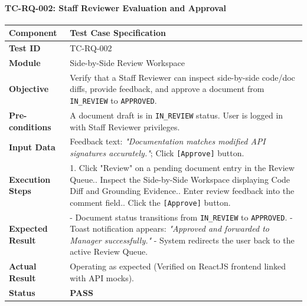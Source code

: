\vspace{0.3cm}

\paragraph{TC-RQ-002: Staff Reviewer Evaluation and Approval}

\begin{longtable}{|l|p{10.5cm}|}
    \hline
    \textbf{Component} & \textbf{Test Case Specification} \\ \hline
    \textbf{Test ID} & TC-RQ-002 \\ \hline
    \textbf{Module} & Side-by-Side Review Workspace \\ \hline
    \textbf{Objective} & Verify that a Staff Reviewer can inspect side-by-side code/doc diffs, provide feedback, and approve a document from \texttt{IN\_REVIEW} to \texttt{APPROVED}. \\ \hline
    \textbf{Pre-conditions} & A document draft is in \texttt{IN\_REVIEW} status. User is logged in with Staff Reviewer privileges. \\ \hline
    \textbf{Input Data} & Feedback text: \textit{"Documentation matches modified API signatures accurately."}; Click \texttt{[Approve]} button. \\ \hline
    \textbf{Execution Steps} & 
    1. Click "Review" on a pending document entry in the Review Queue.\newline
    2. Inspect the Side-by-Side Workspace displaying Code Diff and Grounding Evidence.\newline
    3. Enter review feedback into the comment field.\newline
    4. Click the \texttt{[Approve]} button. \\ \hline
    \textbf{Expected Result} & 
    - Document status transitions from \texttt{IN\_REVIEW} to \texttt{APPROVED}.\newline
    - Toast notification appears: \textit{"Approved and forwarded to Manager successfully."}\newline
    - System redirects the user back to the active Review Queue. \\ \hline
    \textbf{Actual Result} & Operating as expected (Verified on ReactJS frontend linked with API mocks). \\ \hline
    \textbf{Status} & \textbf{\color{green}PASS} \\ \hline
\end{longtable}

